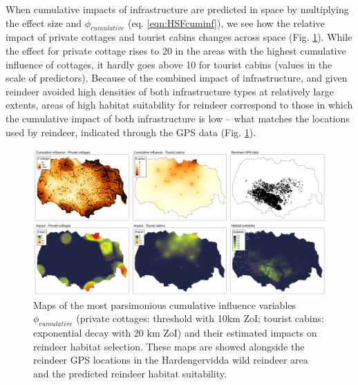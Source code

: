 \documentclass[titlepage]{article}
\begin{document}
When cumulative impacts of infrastructure are predicted in space by multiplying the effect size and $\phi_{cumulative}$ (eq. \ref{eqn:HSFcuminf}), we see how the relative impact of private cottages and tourist cabins changes across space (Fig. \ref{fig:prediction_maps}). While the effect for private cottage rises to 20 in the areas with the highest cumulative influence of cottages, it hardly goes above 10 for tourist cabins (values in the scale of predictors). Because of the combined impact of infrastructure, and given reindeer
avoided high densities of both infrastructure types at relatively large extents, 
areas of high habitat suitability for reindeer correspond to those in which the
cumulative impact of both infrastructure is low -- what matches the
locations used by reindeer, indicated through the GPS data (Fig. \ref{fig:prediction_maps}).

\begin{figure}[h]
\centering
\includegraphics[width=1.3\textwidth,center]{figures/reindeer_results_prediction_maps.png}
\caption{\label{fig:prediction_maps} Maps of the most parsimonious cumulative influence variables $\phi_{cumulative}$ (private cottages: threshold with 10km ZoI; tourist cabins: exponential decay with 20 km ZoI) and their estimated impacts on reindeer habitat selection. These maps are showed alongside the reindeer GPS locations in the Hardengervidda wild reindeer area and the predicted reindeer habitat suitability.}
\end{figure}

\end{document}
